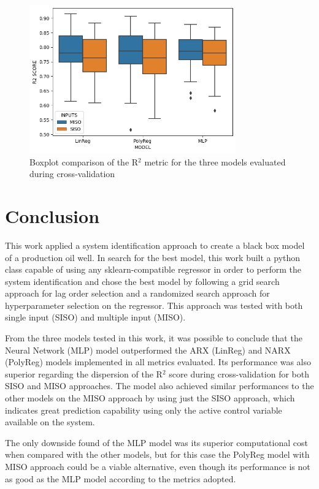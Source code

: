 \documentclass[conference]{IEEEtran}
\begin{document}
\begin{figure}[htbp]
\centerline{\includegraphics[width=3.5in]{images/boxplot_cv.png}}
\caption{Boxplot comparison of the R$^2$ metric for the three models evaluated during cross-validation}
\label{cv_stats}
\end{figure}

\section{Conclusion}\label{section_conclusion}


This work applied a system identification approach to create a black box model of a production oil well. In search for the best model, this work built a python class capable of using any sklearn-compatible regressor in order to perform the system identification and chose the best model by following a grid search approach for lag order selection and a randomized search approach for hyperparameter selection on the regressor. This approach was tested with both single input (SISO) and multiple input (MISO).

From the three models tested in this work, it was possible to conclude that the Neural Network (MLP) model outperformed the ARX (LinReg) and NARX (PolyReg) models implemented in all metrics evaluated. Its performance was also superior regarding the dispersion of the R$^2$ score during cross-validation for both SISO and MISO approaches. The model also achieved similar performances to the other models on the MISO approach by using just the SISO approach, which indicates great prediction capability using only the active control variable available on the system.

The only downside found of the MLP model was its superior computational cost when compared with the other models, but for this case the PolyReg model with MISO approach could be a viable alternative, even though its performance is not as good as the MLP model according to the metrics adopted.
\end{document}
